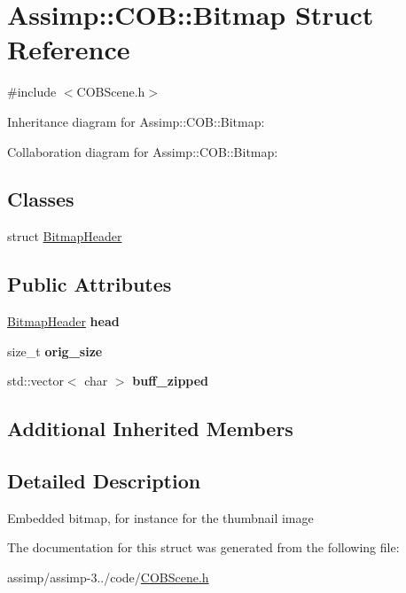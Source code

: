 \hypertarget{struct_assimp_1_1_c_o_b_1_1_bitmap}{\section{Assimp\+:\+:C\+O\+B\+:\+:Bitmap Struct Reference}
\label{struct_assimp_1_1_c_o_b_1_1_bitmap}
}


{\ttfamily \#include $<$C\+O\+B\+Scene.\+h$>$}



Inheritance diagram for Assimp\+:\+:C\+O\+B\+:\+:Bitmap\+:


Collaboration diagram for Assimp\+:\+:C\+O\+B\+:\+:Bitmap\+:
\subsection*{Classes}
\begin{DoxyCompactItemize}
\item 
struct \hyperlink{struct_assimp_1_1_c_o_b_1_1_bitmap_1_1_bitmap_header}{Bitmap\+Header}
\end{DoxyCompactItemize}
\subsection*{Public Attributes}
\begin{DoxyCompactItemize}
\item 
\hypertarget{struct_assimp_1_1_c_o_b_1_1_bitmap_a70a05bf2d9563a39b8b5faab3d20a632}{\hyperlink{struct_assimp_1_1_c_o_b_1_1_bitmap_1_1_bitmap_header}{Bitmap\+Header} {\bfseries head}}\label{struct_assimp_1_1_c_o_b_1_1_bitmap_a70a05bf2d9563a39b8b5faab3d20a632}

\item 
\hypertarget{struct_assimp_1_1_c_o_b_1_1_bitmap_acc74ad4df618e28f1274a6a1c67aa5a5}{size\+\_\+t {\bfseries orig\+\_\+size}}\label{struct_assimp_1_1_c_o_b_1_1_bitmap_acc74ad4df618e28f1274a6a1c67aa5a5}

\item 
\hypertarget{struct_assimp_1_1_c_o_b_1_1_bitmap_a325823b2959aa84fdf025f6fd2987f1f}{std\+::vector$<$ char $>$ {\bfseries buff\+\_\+zipped}}\label{struct_assimp_1_1_c_o_b_1_1_bitmap_a325823b2959aa84fdf025f6fd2987f1f}

\end{DoxyCompactItemize}
\subsection*{Additional Inherited Members}


\subsection{Detailed Description}
Embedded bitmap, for instance for the thumbnail image 

The documentation for this struct was generated from the following file\+:\begin{DoxyCompactItemize}
\item 
assimp/assimp-\/3../code/\hyperlink{_c_o_b_scene_8h}{C\+O\+B\+Scene.\+h}\end{DoxyCompactItemize}
